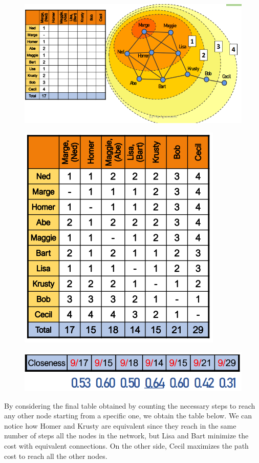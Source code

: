 \documentclass[
  notitlepage,
  onecolumn,
  openany]{book}
\begin{document}
\begin{figure}[h!]

{\centering \includegraphics[width=0.5\linewidth]{images/04-Centrality/Untitled} 

}

\end{figure}
\begin{figure}[h!]

{\centering \includegraphics[width=0.5\linewidth]{images/04-Centrality/Untitled 1} 

}

\end{figure}

\begin{figure}[h!]

{\centering \includegraphics[width=0.5\linewidth]{images/04-Centrality/Untitled 2} 

}

\end{figure}

By considering the final table obtained by counting the necessary steps to reach any other node starting from a specific one, we obtain the table below. We can notice how Homer and Krusty are equivalent since they reach in the same number of steps all the nodes in the network, but Lisa and Bart minimize the cost with equivalent connections. On the other side, Cecil maximizes the path cost to reach all the other nodes.
\end{document}
